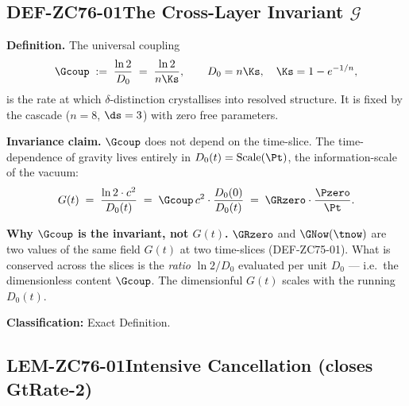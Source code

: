 \documentclass[12pt, a4paper]{article}
\begin{document}
\newpage

\subsection{DEF-ZC76-01\quad The Cross-Layer Invariant $\mathcal{G}$}
\label{sec:def01}


\begin{formalbox}[title={DEF-ZC76-01: $\mathcal{G}$ as Cross-Layer
  Invariant ($R_0$ and $R_0{\to}R_{\max}$, Exact)}]

\textbf{Definition.}
The universal coupling
\begin{equation}
  \Gcoup \;:=\; \frac{\ln 2}{D_0}
  \;=\; \frac{\ln 2}{n\Ks},
  \qquad
  D_0 = n\Ks,\quad \Ks = 1 - e^{-1/n},
  \label{eq:Gdef}
\end{equation}
is the rate at which $\delta$-distinction crystallises into resolved
structure. It is fixed by the cascade ($n=8$, $\ds=3$) with zero free
parameters.

\textbf{Invariance claim.}
$\Gcoup$ does not depend on the time-slice. The time-dependence of
gravity lives entirely in $D_0(t) = \mathrm{Scale}(\Pt)$, the
information-scale of the vacuum:
\begin{equation}
  G(t) \;=\; \frac{\ln 2\cdot c^2}{D_0(t)}
  \;=\; \Gcoup\,c^2 \cdot \frac{D_0(0)}{D_0(t)}
  \;=\; \GRzero\cdot\frac{\Pzero}{\Pt}.
  \label{eq:Gtime}
\end{equation}

\textbf{Why $\Gcoup$ is the invariant, not $G(t)$.}
$\GRzero$ and $\GNow(\tnow)$ are two values of the same field $G(t)$ at
two time-slices (DEF-ZC75-01). What is conserved across the slices is
the \emph{ratio} $\ln2/D_0$ evaluated per unit $D_0$ --- i.e.\ the
dimensionless content $\Gcoup$. The dimensionful $G(t)$ scales with the
running $D_0(t)$.

\textbf{Classification:} Exact Definition.
\end{formalbox}

\subsection{LEM-ZC76-01\quad Intensive Cancellation (closes GtRate-2)}
\label{sec:lem01}
\end{document}

